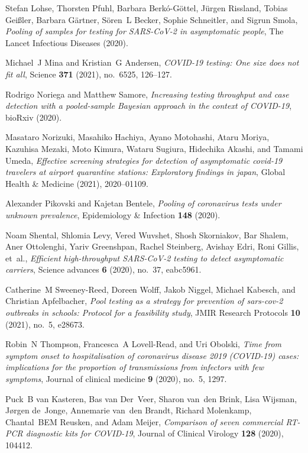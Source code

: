 \documentclass{article}
\begin{document}
\begin{thebibliography}{10}
Stefan Lohse, Thorsten Pfuhl, Barbara Berk{\'o}-G{\"o}ttel, J{\"u}rgen
  Rissland, Tobias Gei{\ss}ler, Barbara G{\"a}rtner, S{\"o}ren~L Becker, Sophie
  Schneitler, and Sigrun Smola, \emph{Pooling of samples for testing for
  {SARS}-{C}o{V}-2 in asymptomatic people}, The Lancet Infectious Diseases
  (2020).

Michael~J Mina and Kristian~G Andersen, \emph{{COVID}-19 testing: {O}ne size
  does not fit all}, Science \textbf{371} (2021), no.~6525, 126--127.

Rodrigo Noriega and Matthew Samore, \emph{Increasing testing throughput and
  case detection with a pooled-sample {B}ayesian approach in the context of
  {COVID}-19}, bioRxiv (2020).

Masataro Norizuki, Masahiko Hachiya, Ayano Motohashi, Ataru Moriya, Kazuhisa
  Mezaki, Moto Kimura, Wataru Sugiura, Hidechika Akashi, and Tamami Umeda,
  \emph{Effective screening strategies for detection of asymptomatic covid-19
  travelers at airport quarantine stations: Exploratory findings in japan},
  Global Health \& Medicine (2021), 2020--01109.

Alexander Pikovski and Kajetan Bentele, \emph{Pooling of coronavirus tests
  under unknown prevalence}, Epidemiology \& Infection \textbf{148} (2020).

Noam Shental, Shlomia Levy, Vered Wuvshet, Shosh Skorniakov, Bar Shalem, Aner
  Ottolenghi, Yariv Greenshpan, Rachel Steinberg, Avishay Edri, Roni Gillis,
  et~al., \emph{Efficient high-throughput {SARS-CoV}-2 testing to detect
  asymptomatic carriers}, Science advances \textbf{6} (2020), no.~37, eabc5961.

Catherine~M Sweeney-Reed, Doreen Wolff, Jakob Niggel, Michael Kabesch, and
  Christian Apfelbacher, \emph{Pool testing as a strategy for prevention of
  sars-cov-2 outbreaks in schools: Protocol for a feasibility study}, JMIR
  Research Protocols \textbf{10} (2021), no.~5, e28673.

Robin~N Thompson, Francesca~A Lovell-Read, and Uri Obolski, \emph{Time from
  symptom onset to hospitalisation of coronavirus disease 2019 ({COVID-19})
  cases: implications for the proportion of transmissions from infectors with
  few symptoms}, Journal of clinical medicine \textbf{9} (2020), no.~5, 1297.

Puck~B van Kasteren, Bas van Der~Veer, Sharon van~den Brink, Lisa Wijsman,
  J{\o}rgen de~Jonge, Annemarie van~den Brandt, Richard Molenkamp, Chantal~BEM
  Reusken, and Adam Meijer, \emph{Comparison of seven commercial {RT-PCR}
  diagnostic kits for {COVID}-19}, Journal of Clinical Virology \textbf{128}
  (2020), 104412.


\end{thebibliography}
\end{document}
